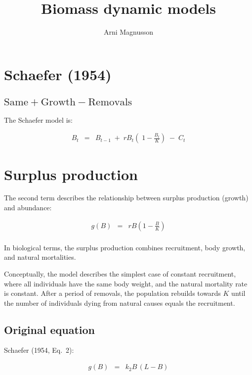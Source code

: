 \documentclass[fleqn]{article}
\title{Biomass dynamic models}
\author{Arni Magnusson}
\begin{document}
\maketitle
\tableofcontents

\newpage

\section{Schaefer (1954)}

\subsection{$\mathrm{Same}+\mathrm{Growth}-\mathrm{Removals}$}

The Schaefer model is:

\begin{eqnarray*}
  B_t &=& B_{t-1} \;+\; rB_t\!\left(\;\!\!1\!-\!\frac{B_t}{K}\right) \;-\; C_t
\end{eqnarray*}

\section{Surplus production}

The second term describes the relationship between surplus production (growth)
and abundance:

\begin{eqnarray*}
  g(B) &=& rB\left(1-\frac{B}{K}\right)\\[1ex]
\end{eqnarray*}

In biological terms, the surplus production combines recruitment, body growth,
and natural mortalities.

Conceptually, the model describes the simplest case of constant recruitment,
where all individuals have the same body weight, and the natural mortality rate
is constant. After a period of removals, the population rebuilds towards $K$
until the number of individuals dying from natural causes equals the
recruitment.

\subsection{Original equation}

Schaefer (1954, Eq.~2):

\begin{eqnarray*}
  g(B) &=& k_2B\,(L-B)\\[1ex]
\end{eqnarray*}
\end{document}
